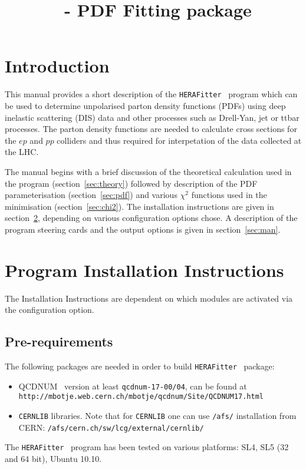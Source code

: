 \documentclass[11pt,a4paper]{article}
\title{\fitter\ - PDF Fitting package}
\newcommand\fitter{ \mbox{\tt HERAFitter} }
\begin{document}
\maketitle
\begin{abstract}
\end{abstract}
\tableofcontents
\newpage
\section{Introduction}
This manual provides a short description of the \fitter\ program 
which can be used to determine unpolarised parton density functions 
(PDFs) using deep inelastic scattering (DIS) data and other processes such as 
Drell-Yan, jet or ttbar processes.
The parton density functions are needed to calculate cross sections
for the $ep$ and $pp$ colliders and thus required for interpetation
of the data collected at the LHC.

The manual begins with a brief discussion of the theoretical calculation
used in the program (section~\ref{sec:theory}) followed by description of the
PDF parameterisation (section~\ref{sec:pdf}) and various $\chi^2$ functions used in the
minimisation (section~\ref{sec:chi2}). The installation instructions are given in
section~\ref{sec:install}, depending on various configuration options chose. A description of the program steering cards and
the output options is given in section~\ref{sec:man}.
\section{Program Installation Instructions} 
\label{sec:install}

The Installation Instructions are dependent on which modules are activated via the configuration option. 
\subsection{Pre-requirements}

The following packages are needed in order to build \fitter\ package:
\begin{itemize}
\item QCDNUM~\cite{qcdnum} version at least {\tt qcdnum-17-00/04}, can be found at \\
  {\tt http://mbotje.web.cern.ch/mbotje/qcdnum/Site/QCDNUM17.html}
\item {\tt CERNLIB} libraries. Note that for {\tt CERNLIB} one can use {\tt /afs/} installation from CERN:
  {\tt /afs/cern.ch/sw/lcg/external/cernlib/}
\end{itemize}
The \fitter\ program has been tested on various platforms: 
   SL4, SL5 (32 and 64 bit),  Ubuntu 10.10.
\end{document}
